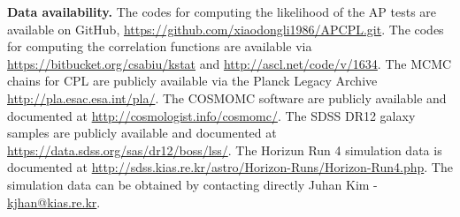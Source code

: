 \documentclass{natureprintstyle}
\begin{document}
\noindent
{\textbf{Data availability.}} 
The codes for computing the likelihood of the AP tests are available on GitHub,
\href{https://github.com/xiaodongli1986/APCPL.git}
{https://github.com/xiaodongli1986/APCPL.git}.
The codes for computing the correlation functions are available via
\href{https://bitbucket.org/csabiu/kstat}
{https://bitbucket.org/csabiu/kstat} and \href{http://ascl.net/code/v/1634}{http://ascl.net/code/v/1634}.
The MCMC chains for CPL are publicly available via the Planck Legacy Archive
\href{http://pla.esac.esa.int/pla/}
{http://pla.esac.esa.int/pla/}.
The COSMOMC software are publicly available and documented at
\href{http://cosmologist.info/cosmomc/}
{http://cosmologist.info/cosmomc/}.
The SDSS DR12 galaxy samples are publicly available and documented at
\href{https://data.sdss.org/sas/dr12/boss/lss/}
{https://data.sdss.org/sas/dr12/boss/lss/}.
The Horizun Run 4 simulation data is documented at
\href{http://sdss.kias.re.kr/astro/Horizon-Runs/Horizon-Run4.php}
{http://sdss.kias.re.kr/astro/Horizon-Runs/Horizon-Run4.php}.
The simulation data can be obtained by contacting directly Juhan Kim - \href{kjhan@kias.re.kr}{kjhan@kias.re.kr}.


%
\end{document}
